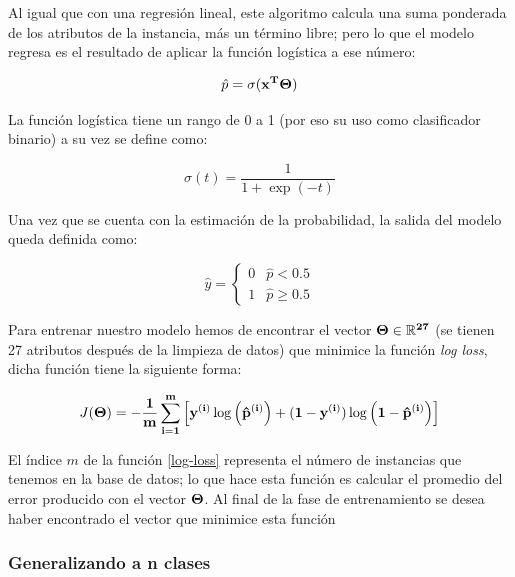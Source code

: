 \documentclass[journal]{IEEEtran}                                                          %
\begin{document}
            Al igual que con una regresión lineal, este algoritmo calcula una suma ponderada de los atributos de la instancia, más un término libre; pero lo que el modelo regresa es el resultado de aplicar la función logística a ese número:

            \begin{equation}
                \hat{p} = \sigma(\bf{x}^{T}\bf{\Theta})
            \end{equation}

            La función logística tiene un rango de 0 a 1 (por eso su uso como clasificador binario) a su vez se define como:

            \begin{equation}
                \sigma(t) = \frac{1}{1 + \exp(-t)}
            \end{equation}

            Una vez que se cuenta con la estimación de la probabilidad, la salida del modelo queda definida como:

            \begin{equation}
                \hat{y} = \begin{cases}
                    0 & \hat{p} < 0.5 \\
                    1 & \hat{p} \geq 0.5
                \end{cases}
            \end{equation}

            Para entrenar nuestro modelo hemos de encontrar el vector $\bf{\Theta} \in \mathbb{R}^{27}$ (se tienen 27 atributos después de la limpieza de datos) que minimice la función \emph{log loss}, dicha función tiene la siguiente forma:
            
            \begin{equation} \label{log-loss}
                J(\bf{\Theta}) = - \frac{1}{m} \sum_{i=1}^{m} \left[y^{(i)} \log \left(\hat{p}^{(i)}\right) + (1 - y^{(i)}) \log \left(1 - \hat{p}^{(i)} \right) \right]
            \end{equation}

            El índice $m$ de la función \ref{log-loss} representa el número de instancias que tenemos en la base de datos; lo que hace esta función es calcular el promedio del error producido con el vector $\bf{\Theta}$. Al final de la fase de entrenamiento se desea haber encontrado el vector que minimice esta función

            \subsubsection{Generalizando a n clases}
\end{document}
